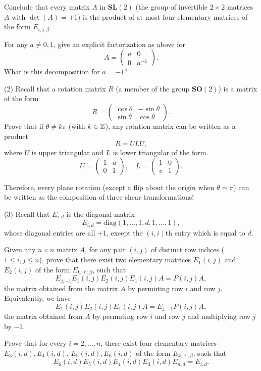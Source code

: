 \documentclass[12pt]{article}
\begin{document}
\medskip
Conclude that every matrix $A$ in $\mathbf{SL}(2)$ 
(the group of invertible $2\times 2$ matrices $A$ with
$\det(A) = +1$)  is the product of
at most four elementary matrices
of the form $E_{i, j; \beta}$.

\medskip
For any $a\not= 0, 1$, give an explicit factorization as above for
\[
A = 
\begin{pmatrix}
a & 0 \\
0 & a^{-1}
\end{pmatrix}.
\]
What is this decomposition for $a = -1$?

\medskip
(2)
Recall that a rotation matrix $R$ (a member of the group
$\mathbf{SO}(2)$)  is a matrix of the form
\[
R = 
\begin{pmatrix}
\cos\theta & -\sin\theta \\
\sin\theta & \cos\theta
\end{pmatrix}.
\]
Prove that if $\theta \not= k \pi$ (with $k \in {\mathbb Z}$), 
any rotation matrix can be written as a product 
\[
R = U L U,
\] 
where $U$ is upper triangular and $L$ is lower triangular 
of the form
\[
U = 
\begin{pmatrix}
1 & u \\
0 & 1
\end{pmatrix},
\quad
L = 
\begin{pmatrix}
1 & 0 \\
v & 1
\end{pmatrix}.
\]

\medskip
Therefore, every plane rotation (except a flip about the origin when 
$\theta = \pi$) can be written as the composition of three
shear transformations!

\medskip
(3)
Recall that $E_{i, d}$ is  the diagonal matrix
\[
E_{i, d} = \mathrm{diag}(1,\ldots, 1, d, 1, \ldots,  1),
\]
whose diagonal entries are all $+1$, except the $(i, i)$th entry which
is equal to $d$.

\medskip
Given any $n\times n$ matrix $A$, for any pair $(i, j)$ of distinct
row indices ($1 \leq i, j \leq n$), 
prove that there exist two elementary matrices $E_1(i,j)$ and $E_2(i,j)$
of the form $E_{k,\ell; \beta}$, 
such that
\[
E_{j,-1} E_1(i,j)E_2(i,j)E_1(i,j) A = P(i, j) A,
\]
the matrix obtained from the matrix $A$ by permuting row $i$ and row $j$.
Equivalently, we have
\[
 E_1(i,j)E_2(i,j)E_1(i,j) A = E_{j,-1}P(i, j) A,
\]
the matrix obtained from $A$ by permuting row $i$ and row $j$ and
multiplying row $j$ by $-1$.

\medskip
Prove that for every $i = 2, \ldots, n$, there exist four elementary matrices
$E_3(i,d), E_4(i,d)$, $E_5(i,d), E_6(i,d)$  of the form $E_{k,\ell; \beta}$, 
such that
\[
E_6(i,d)E_5(i,d)E_4(i,d)E_3(i,d) E_{n,d} = E_{i, d}.
\]
\end{document}
